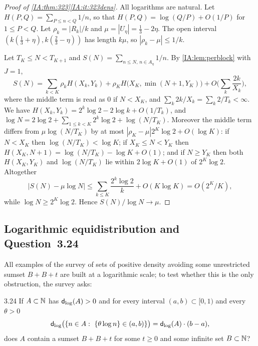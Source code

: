 \begin{proof}[Proof of \cref{IA:thm:323}\ref{IA:it:323dens}]
All logarithms are natural. Let $H(P,Q)=\sum_{P\le n<Q}1/n$, so that
$H(P,Q)=\log(Q/P)+O(1/P)$ for $1\le P<Q$. Let $\rho_k=|R_k|/k$ and $\mu=|U_\eta|=\frac13-2\eta$. The open interval
$(k(\frac13+\eta),k(\frac23-\eta))$ has length $k\mu$, so $|\rho_k-\mu|\le1/k$.

Let $T_K\le N<T_{K+1}$ and $S(N)=\sum_{n\le N,\,n\in A_\eta}1/n$. By \cref{IA:lem:perblock} with
$J=1$,
\[
S(N)=\sum_{k<K}\rho_kH(X_k,Y_k)+\rho_K H\big(X_K,\min(N+1,Y_K)\big)+O\Big(\sum_k\frac{2k}{X_k}\Big),
\]
where the middle term is read as $0$ if $N<X_K$, and $\sum_k2k/X_k=\sum_k2/T_k<\infty$. We have
$H(X_k,Y_k)=2^k\log2-2\log k+O(1/T_k)$, and
$\log N=2\log 2+\sum_{1\le k<K}2^k\log2+\log(N/T_K)$. Moreover the middle term differs from
$\mu\log(N/T_K)$ by at most $|\rho_K-\mu|2^K\log 2+O(\log K)$: if $N<X_K$ then $\log(N/T_K)<\log K$;
if $X_K\le N<Y_K$ then $H(X_K,N+1)=\log(N/T_K)-\log K+O(1)$; and if $N\ge Y_K$ then both
$H(X_K,Y_K)$ and $\log(N/T_K)$ lie within $2\log K+O(1)$ of $2^K\log 2$. Altogether
\[
\big|S(N)-\mu\log N\big|\le\sum_{k\le K}\frac{2^k\log2}{k}+O(K\log K)=O(2^K/K),
\]
while $\log N\ge2^K\log2$. Hence $S(N)/\log N\to\mu$.
\end{proof}



\subsection{Logarithmic equidistribution and Question~3.24}\label{IA:sec:q324}
All examples of the survey of sets of positive density avoiding some unrestricted sumset $B+B+t$
are built at a logarithmic scale; to test whether this is the only obstruction, the survey asks:

\begin{question}{3.24}\label{IA:q:324}
If $A\subset\mathbb{N}$ has $\mathsf{d}_{\log}(A)>0$ and for every interval $(a,b)\subset[0,1)$ and every $\theta>0$
\begin{equation}\label{IA:eq:324}
\mathsf{d}_{\log}\big(\{n\in A:\ \{\theta\log n\}\in(a,b)\}\big)=\mathsf{d}_{\log}(A)\cdot(b-a),
\end{equation}
does $A$ contain a sumset $B+B+t$ for some $t\ge0$ and some infinite set $B\subset\mathbb{N}$?
\end{question}

